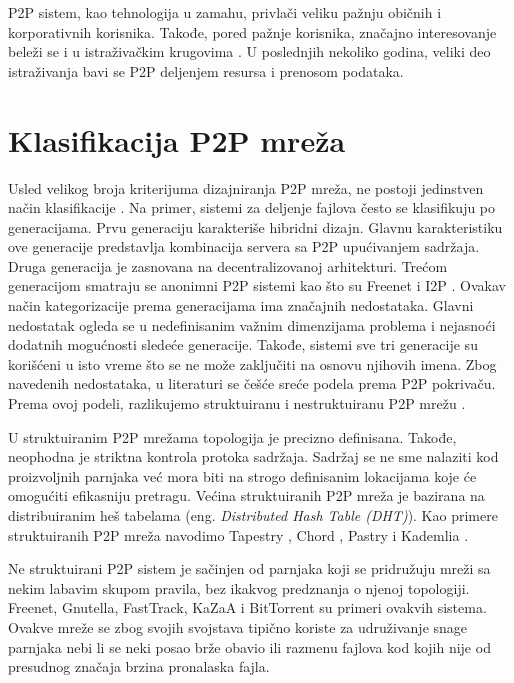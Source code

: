 \documentclass[12pt,oneside]{memoir}
\begin{document}
P2P sistem, kao tehnologija u zamahu, privlači veliku pažnju običnih i korporativnih korisnika. Takođe, pored pažnje korisnika, značajno interesovanje beleži se i u istraživačkim krugovima \cite{DeBoever07}. U poslednjih nekoliko godina, veliki deo istraživanja bavi se P2P deljenjem resursa i prenosom podataka. 

\section{Klasifikacija P2P mreža}
\label{P2P.2}

Usled velikog broja kriterijuma dizajniranja P2P mreža, ne postoji jedinstven način klasifikacije \cite{Shen:2009}. Na primer, sistemi za deljenje fajlova često se klasifikuju po generacijama. Prvu generaciju karakteriše hibridni dizajn. Glavnu karakteristiku ove generacije predstavlja kombinacija servera sa P2P upućivanjem sadržaja. Druga generacija je zasnovana na decentralizovanoj arhitekturi. Trećom generacijom smatraju se anonimni P2P sistemi kao što su Freenet \cite{Clarke_2001} i I2P \cite{I2P}. Ovakav način kategorizacije prema generacijama ima značajnih nedostataka. Glavni nedostatak ogleda se u nedefinisanim važnim dimenzijama problema i nejasnoći dodatnih mogućnosti sledeće generacije. Takođe, sistemi sve tri generacije su korišćeni u isto vreme što se ne može zaključiti na osnovu njihovih imena. Zbog navedenih nedostataka, u literaturi se češće sreće podela prema P2P pokrivaču. Prema ovoj podeli, razlikujemo struktuiranu i nestruktuiranu P2P mrežu  \cite{Prasanna_Ganesan_2004}.

U struktuiranim P2P mrežama topologija je precizno definisana. 
Takođe, neophodna je striktna kontrola protoka sadržaja. Sadržaj se ne sme nalaziti kod proizvoljnih parnjaka već mora biti na strogo definisanim lokacijama koje će omogućiti efikasniju pretragu.
Većina struktuiranih P2P mreža je bazirana na distribuiranim heš tabelama (eng. \textit{Distributed Hash Table (DHT)}). Kao primere struktuiranih P2P mreža navodimo Tapestry \cite{Zhao_2004}, Chord \cite{Stoica_2003}, Pastry \cite{Rowstron_2001} i Kademlia \cite{Maymounkov_2002}.

Ne struktuirani P2P sistem je sačinjen od parnjaka koji se pridružuju mreži sa nekim labavim skupom pravila, bez ikakvog predznanja o njenoj topologiji. Freenet, Gnutella, FastTrack, KaZaA i BitTorrent su primeri ovakvih sistema. Ovakve mreže se zbog svojih svojstava tipično koriste za udruživanje snage parnjaka nebi li se neki posao brže obavio ili razmenu fajlova kod kojih nije od presudnog značaja brzina pronalaska fajla. 
\end{document}
